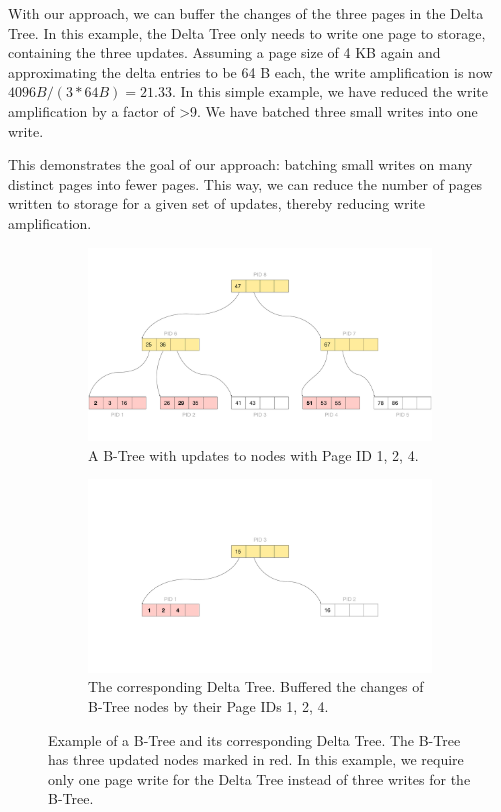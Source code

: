With our approach, we can buffer the changes of the three pages in the Delta Tree.
In this example, the Delta Tree only needs to write one page to storage, containing the three updates.
Assuming a page size of 4 KB again and approximating the delta entries to be 64 B each, the write amplification is now $4096 B / (3 * 64 B) = 21.33$.
In this simple example, we have reduced the write amplification by a factor of >9.
We have batched three small writes into one write.

This demonstrates the goal of our approach: batching small writes on many distinct pages into fewer pages.
This way, we can reduce the number of pages written to storage for a given set of updates, thereby reducing write amplification.

\begin{figure}[htpb]
  \centering
  \begin{subfigure}[t]{0.95\textwidth}
    \centering
    \includegraphics[width=\textwidth]{figures/b_tree_with_pid.pdf}
    \caption{A B-Tree with updates to nodes with Page ID {1, 2, 4}.}
  \end{subfigure}
  \hfill
  \begin{subfigure}[t]{0.95\textwidth}
    \centering
    \includegraphics[width=\textwidth]{figures/delta_tree_update.pdf}
    \caption{The corresponding Delta Tree. Buffered the changes of B-Tree nodes by their Page IDs {1, 2, 4}.}
  \end{subfigure}
  \caption{Example of a B-Tree and its corresponding Delta Tree. The B-Tree has three updated nodes marked in red. In this example, we require only one page write for the Delta Tree instead of three writes for the B-Tree.}
  \label{fig:delta-tree-example}
\end{figure}
